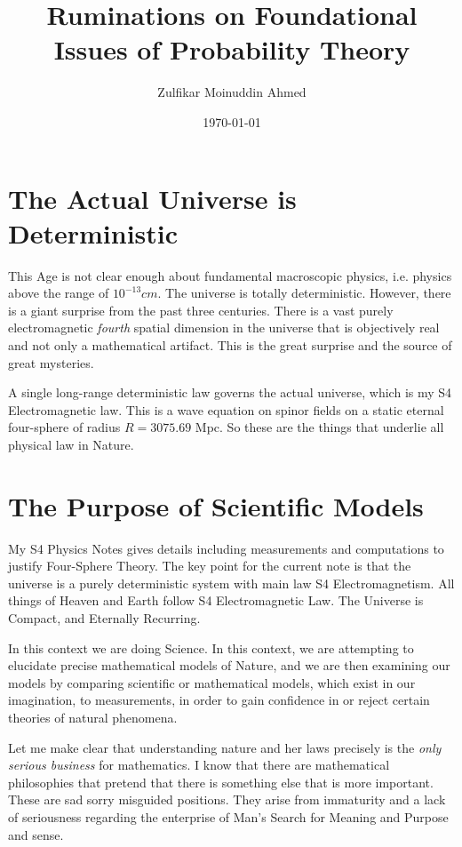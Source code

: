 \documentclass{amsart}
\title{Ruminations on Foundational Issues of Probability Theory}
\author{Zulfikar Moinuddin Ahmed}
\date{\today}
\begin{document}
\maketitle

\section{The Actual Universe is Deterministic}

This Age is not clear enough about fundamental macroscopic physics, i.e. physics above the range of $10^{-13} cm$.  The universe is totally deterministic.  However, there is a giant surprise from the past three centuries.  There is a vast purely electromagnetic {\em fourth} spatial dimension in the universe that is objectively real and not only a mathematical artifact.  This is the great surprise and the source of great mysteries.

A single long-range deterministic law governs the actual universe, which is my S4 Electromagnetic law.  This is a wave equation on spinor fields on a static eternal four-sphere of radius $R=3075.69$ Mpc.  So these are the things that underlie all physical law in Nature.

\section{The Purpose of Scientific Models}

My S4 Physics Notes gives details including measurements and computations to justify Four-Sphere Theory.  The key point for the current note is that the universe is a purely deterministic system with main law S4 Electromagnetism.  All things of Heaven and Earth follow S4 Electromagnetic Law.  The Universe is Compact, and Eternally Recurring.

In this context we are doing Science.  In this context, we are attempting to elucidate precise mathematical models of Nature, and we are then examining our models by comparing scientific or mathematical models, which exist in our imagination, to measurements, in order to gain confidence in or reject certain theories of natural phenomena.

Let me make clear that understanding nature and her laws precisely is the {\em only serious business} for mathematics.  I know that there are mathematical philosophies that pretend that there is something else that is more important.  These are sad sorry misguided positions.  They arise from immaturity and a lack of seriousness regarding the enterprise of Man's Search for Meaning and Purpose and sense.
\end{document}
